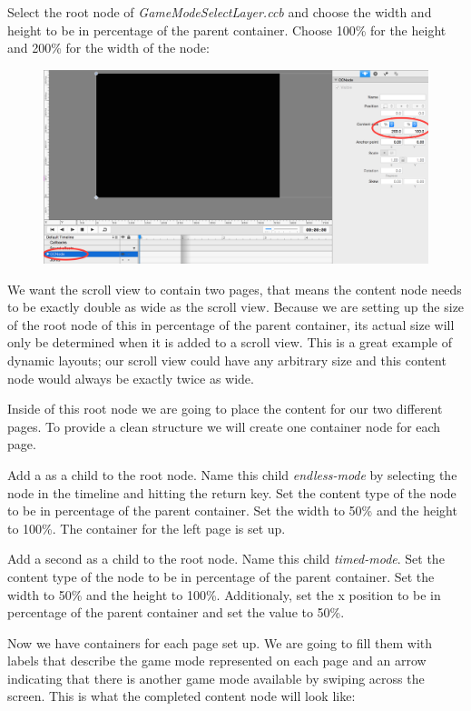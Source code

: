\begin{leftbar}
Select the root node of \textit{GameModeSelectLayer.ccb} and choose the width
and height to be in percentage of the parent container. Choose 100\% for the
height and 200\% for the width of the node:
\begin{figure}[H]
		\centering
		\includegraphics[width=0.6\linewidth]{images/Chapter7/content_node_width.png}
\end{figure}
\end{leftbar}
We want the scroll view to contain two pages, that means the content node needs
to be exactly double as wide as the scroll view. Because we are setting up the
size of the root node of this \ccbfile{} in percentage of the parent container,
its actual size will only be determined when it is added to a scroll view. This
is a great example of dynamic layouts; our scroll view could have any
arbitrary size and this content node would always be exactly twice as wide.

Inside of this root node we are going to place the content for our two different
pages. To provide a clean structure we will create one container node for each
page.

\begin{leftbar}
Add a \ccnode{} as a child to the root node. Name this child
\textit{endless-mode} by selecting the node in the timeline and hitting the
return key. Set the content type of the node to be in percentage of the parent
container. Set the width to 50\% and the height to 100\%. The container for the
left page is set up.
\end{leftbar}

\begin{leftbar}
Add a second \ccnode{} as a child to the root node. Name this child
\textit{timed-mode}. Set the content type of the node to be in percentage of the parent
container. Set the width to 50\% and the height to 100\%. Additionaly, set the x
position to be in percentage of the parent container and set the value to 50\%.
\end{leftbar}

Now we have containers for each page set up. We are going to fill them with
labels that describe the game mode represented on each page and an arrow
indicating that there is another game mode available by swiping across the
screen. This is what the completed content node will look like:

